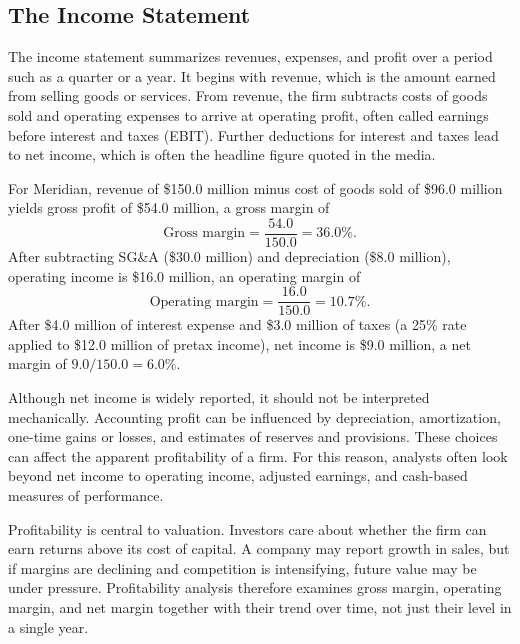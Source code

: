 \documentclass[../ai_in_finance]{subfiles}
\begin{document}
\subsection{The Income Statement}

The income statement summarizes revenues, expenses, and profit over a period such as a quarter or a year. It begins with revenue, which is the amount earned from selling goods or services. From revenue, the firm subtracts costs of goods sold and operating expenses to arrive at operating profit, often called earnings before interest and taxes (EBIT). Further deductions for interest and taxes lead to net income, which is often the headline figure quoted in the media.

For Meridian, revenue of \$150.0 million minus cost of goods sold of \$96.0 million yields gross profit of \$54.0 million, a gross margin of
\begin{equation*}
\text{Gross margin} = \frac{54.0}{150.0} = 36.0\%.
\end{equation*}
After subtracting SG\&A (\$30.0 million) and depreciation (\$8.0 million), operating income is \$16.0 million, an operating margin of
\begin{equation*}
\text{Operating margin} = \frac{16.0}{150.0} = 10.7\%.
\end{equation*}
After \$4.0 million of interest expense and \$3.0 million of taxes (a 25\% rate applied to \$12.0 million of pretax income), net income is \$9.0 million, a net margin of $9.0/150.0 = 6.0\%$.

Although net income is widely reported, it should not be interpreted mechanically. Accounting profit can be influenced by depreciation, amortization, one-time gains or losses, and estimates of reserves and provisions. These choices can affect the apparent profitability of a firm. For this reason, analysts often look beyond net income to operating income, adjusted earnings, and cash-based measures of performance.

Profitability is central to valuation. Investors care about whether the firm can earn returns above its cost of capital. A company may report growth in sales, but if margins are declining and competition is intensifying, future value may be under pressure. Profitability analysis therefore examines gross margin, operating margin, and net margin together with their trend over time, not just their level in a single year.
\end{document}
